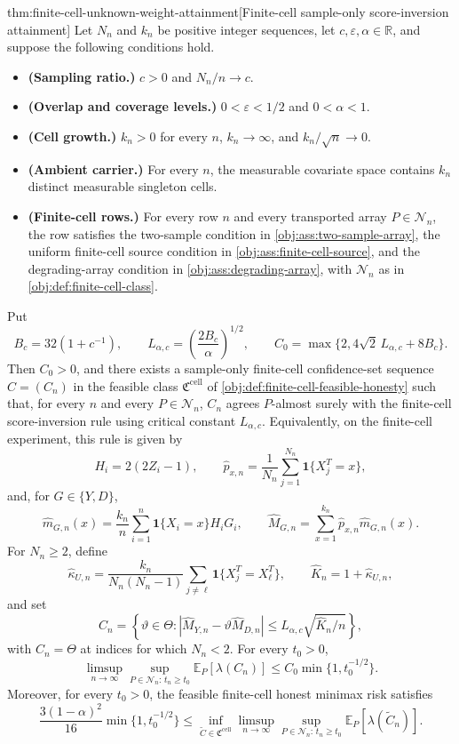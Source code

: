\begin{theoremv}{thm:finite-cell-unknown-weight-attainment}[Finite-cell sample-only score-inversion attainment]
Let \(N_n\) and \(k_n\) be positive integer sequences, let \(c,\varepsilon,\alpha\in\mathbb R\), and suppose the following conditions hold.
\begin{itemize}
\item \textbf{(Sampling ratio.)} \(c>0\) and \(N_n/n\to c\).
\item \textbf{(Overlap and coverage levels.)} \(0<\varepsilon<1/2\) and \(0<\alpha<1\).
\item \textbf{(Cell growth.)} \(k_n>0\) for every \(n\), \(k_n\to\infty\), and \(k_n/\sqrt n\to0\).
\item \textbf{(Ambient carrier.)} For every \(n\), the measurable covariate space contains \(k_n\) distinct measurable singleton cells.
\item \textbf{(Finite-cell rows.)} For every row \(n\) and every transported array \(P\in\mathcal N_n\), the row satisfies the two-sample condition in \cref{obj:ass:two-sample-array}, the uniform finite-cell source condition in \cref{obj:ass:finite-cell-source}, and the degrading-array condition in \cref{obj:ass:degrading-array}, with \(\mathcal N_n\) as in \cref{obj:def:finite-cell-class}.
\end{itemize}
Put
\[
B_c=32(1+c^{-1}),\qquad
L_{\alpha,c}=\left(\frac{2B_c}{\alpha}\right)^{1/2},\qquad
C_0=\max\{2,4\sqrt2\,L_{\alpha,c}+8B_c\}.
\]
Then \(C_0>0\), and there exists a sample-only finite-cell confidence-set sequence \(C=(C_n)\) in the feasible class \(\mathfrak C^{\mathrm{cell}}\) of \cref{obj:def:finite-cell-feasible-honesty} such that, for every \(n\) and every \(P\in\mathcal N_n\), \(C_n\) agrees \(P\)-almost surely with the finite-cell score-inversion rule using critical constant \(L_{\alpha,c}\). Equivalently, on the finite-cell experiment, this rule is given by
\[
H_i=2(2Z_i-1),\qquad
\widehat p_{x,n}=\frac1{N_n}\sum_{j=1}^{N_n}\mathbf 1\{X_j^T=x\},
\]
and, for \(G\in\{Y,D\}\),
\[
\widehat m_{G,n}(x)=\frac{k_n}{n}\sum_{i=1}^n
\mathbf 1\{X_i=x\}H_iG_i,\qquad
\widehat M_{G,n}=\sum_{x=1}^{k_n}\widehat p_{x,n}\widehat m_{G,n}(x).
\]
For \(N_n\ge2\), define
\[
\widehat\kappa_{U,n}
=\frac{k_n}{N_n(N_n-1)}
\sum_{j\ne\ell}\mathbf 1\{X_j^T=X_\ell^T\},\qquad
\widehat K_n=1+\widehat\kappa_{U,n},
\]
and set
\[
C_n=\left\{\vartheta\in\Theta:
|\widehat M_{Y,n}-\vartheta\widehat M_{D,n}|
\le L_{\alpha,c}\sqrt{\widehat K_n/n}\right\},
\]
with \(C_n=\Theta\) at indices for which \(N_n<2\). For every \(t_0>0\),
\[
\limsup_{n\to\infty}\sup_{P\in\mathcal N_n:\,t_n\ge t_0}
\mathbb E_P[\lambda(C_n)]
\le
C_0\min\{1,t_0^{-1/2}\}.
\]
Moreover, for every \(t_0>0\), the feasible finite-cell honest minimax risk satisfies
\[
\frac{3(1-\alpha)^2}{16}\min\{1,t_0^{-1/2}\}
\le
\inf_{\widetilde C\in\mathfrak C^{\mathrm{cell}}}
\limsup_{n\to\infty}\sup_{P\in\mathcal N_n:\,t_n\ge t_0}
\mathbb E_P[\lambda(\widetilde C_n)].
\]
\end{theoremv}

